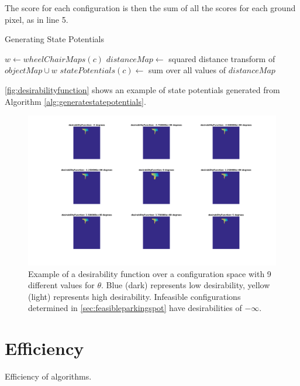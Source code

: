 The score for each configuration is then the sum of all the scores for each
ground pixel, as in line 5.

\begin{algorithm}
\caption{Generating State Potentials}
\label{alg:generatestatepotentials}
\begin{algorithmic}[1]
\Statex
{}
        \State $w \gets wheelChairMaps(c)$
        \State $distanceMap \gets$ squared distance transform of $objectMap \cup w$
        \State $statePotentials(c) \gets$ sum over all values of $distanceMap$
    \EndFor
\EndFunction
\Statex
{}
\end{algorithmic}
\end{algorithm}

\autoref{fig:desirabilityfunction} shows an example of state potentials
generated from Algorithm \autoref{alg:generatestatepotentials}.

\begin{figure}
\centering
\includegraphics[width=6in]{figures/desirabilityfunction.png}
\caption{Example of a desirability function over a configuration space with 9
different values for $\theta$. Blue (dark) represents low desirability, yellow
(light) represents high desirability. Infeasible configurations determined in 
\autoref{sec:feasibleparkingspot} have desirabilities of $-\infty$.} 
\label{fig:desirabilityfunction}
\end{figure}

\section{Efficiency}
Efficiency of algorithms.


